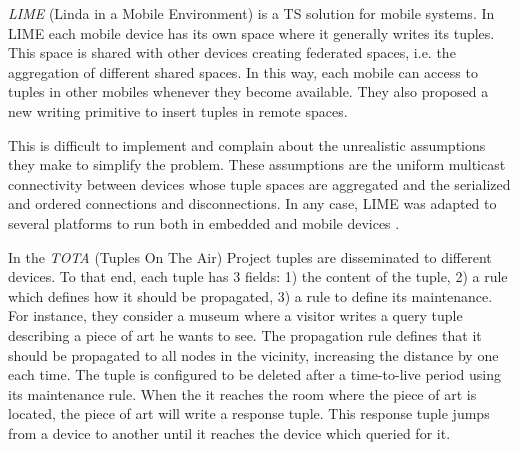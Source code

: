 \emph{LIME} (Linda in a Mobile Environment) \citep{picco_lime:_1999} is a TS solution for mobile systems.
In LIME each mobile device has its own space where it generally writes its tuples.
This space is shared with other devices creating federated spaces, i.e. the aggregation of different shared spaces.
In this way, each mobile can access to tuples in other mobiles whenever they become available.
They also proposed a new writing primitive to insert tuples in remote spaces.

This is difficult to implement and \citet{coulouris_distributed_2012} complain about the unrealistic assumptions they make to simplify the problem. %
These assumptions are the uniform multicast connectivity between devices whose tuple spaces are aggregated and the serialized and ordered connections and disconnections.
In any case, LIME was adapted to several platforms to run both in embedded and mobile devices \citep{murphy_transiently_2006}.


In the \emph{TOTA} (Tuples On The Air) Project \citep{mamei_programming_2009} tuples are disseminated to different devices.
To that end, each tuple has 3 fields:
1) the content of the tuple,
2) a rule which defines how it should be propagated,
3) a rule to define its maintenance.
For instance, they consider a museum where a visitor writes a query tuple describing a piece of art he wants to see.
The propagation rule defines that it should be propagated to all nodes in the vicinity, increasing the distance by one each time.
The tuple is configured to be deleted after a time-to-live period using its maintenance rule.
When the it reaches the room where the piece of art is located, the piece of art will write a response tuple.
This response tuple jumps from a device to another until it reaches the device which queried for it.


